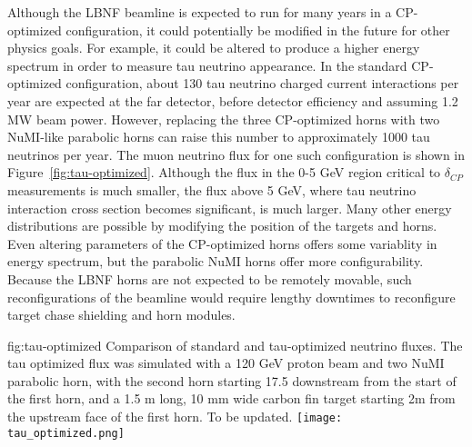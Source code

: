 Although the LBNF beamline is expected to run for many years in a CP-optimized configuration, it could potentially be modified in the future for other physics goals.  For example, it could be altered to produce a higher energy spectrum in order to measure tau neutrino appearance.  In the standard CP-optimized configuration, about 130 tau neutrino charged current interactions per year are expected at the far detector, before detector efficiency and assuming 1.2 MW beam power.  However, replacing the three CP-optimized horns with two NuMI-like parabolic horns can raise this number to approximately 1000 tau neutrinos per year.  The muon neutrino flux for one such configuration is shown in Figure~\ref{fig:tau-optimized}.  Although the flux in the 0-5 GeV region critical to $\delta_{CP}$ measurements is much smaller, the flux above 5 GeV, where tau neutrino interaction cross section becomes significant, is much larger.  Many other energy distributions are possible by modifying the position of the targets and horns.  Even altering parameters of the CP-optimized horns offers some variablity in energy spectrum, but the parabolic NuMI horns offer more configurability.  Because the LBNF horns are not expected to be remotely movable, such reconfigurations of the beamline would require lengthy downtimes to reconfigure target chase shielding and horn modules.   

\begin{dunefigure}{fig:tau-optimized}
{Comparison of standard and tau-optimized neutrino fluxes.  The tau optimized flux was simulated with a 120 GeV proton beam and two NuMI parabolic horn, with the second horn starting 17.5 downstream from the start of the first horn, and a 1.5 m long, 10 mm wide carbon fin target starting 2m from the upstream face of the first horn.  To be updated.  }
\texttt{[image: tau\_optimized.png]}
\end{dunefigure}

